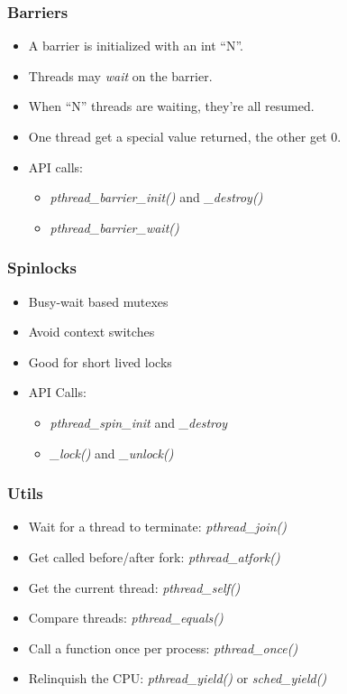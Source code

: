 \begin{frame}
  \frametitle{Barriers}

  \begin{itemize}
  \item A barrier is initialized with an int ``N''.
  \item Threads may \emph{wait} on the barrier.
  \item When ``N'' threads are waiting, they're all resumed.
  \item One thread get a special value returned, the other get 0.
  \item API calls:
    \begin{itemize}
    \item \emph{pthread\_barrier\_init()} and \emph{\_destroy()}
    \item \emph{pthread\_barrier\_wait()}
    \end{itemize}
  \end{itemize}
\end{frame}


\begin{frame}
  \frametitle{Spinlocks}

  \begin{itemize}
  \item Busy-wait based mutexes
  \item Avoid context switches
  \item Good for short lived locks
  \item API Calls:
    \begin{itemize}
    \item \emph{pthread\_spin\_init} and \emph{\_destroy}
    \item \emph{\_lock()} and \emph{\_unlock()}
    \end{itemize}
  \end{itemize}
\end{frame}


\begin{frame}
  \frametitle{Utils}

  \begin{itemize}
  \item Wait for a thread to terminate: \emph{pthread\_join()}
  \item Get called before/after fork: \emph{pthread\_atfork()}
  \item Get the current thread: \emph{pthread\_self()}
  \item Compare threads: \emph{pthread\_equals()}
  \item Call a function once per process: \emph{pthread\_once()}
  \item Relinquish the CPU: \emph{pthread\_yield()} or \emph{sched\_yield()}
  \end{itemize}
\end{frame}

